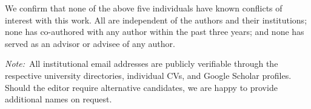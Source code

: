 \documentclass[11pt,a4paper]{article}
\begin{document}
We confirm that none of the above five individuals have known
conflicts of interest with this work. All are independent of the
authors and their institutions; none has co-authored with any
author within the past three years; and none has served as an
advisor or advisee of any author.

\smallskip

\noindent\textit{Note:}\ All institutional email addresses are
publicly verifiable through the respective university directories,
individual CVs, and Google Scholar profiles. Should the editor
require alternative candidates, we are happy to provide additional
names on request.
\end{document}
